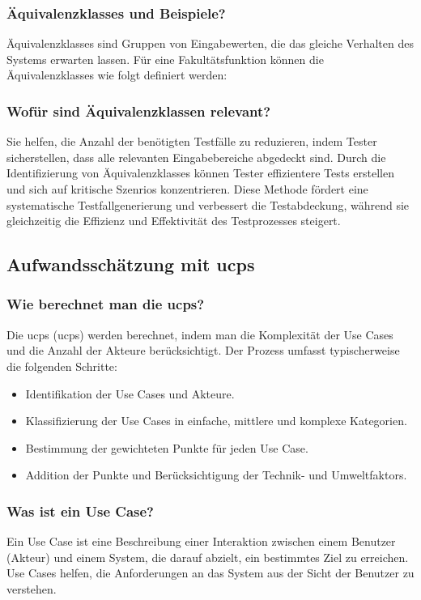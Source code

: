 \documentclass[main.tex]{subfiles}
\begin{document}
\subsubsection*{\glspl{Äquivalenzklasse} und Beispiele?} %
\glspl{Äquivalenzklasse} sind Gruppen von Eingabewerten, die das gleiche Verhalten des Systems erwarten lassen. Für eine Fakultätsfunktion können die \glspl{Äquivalenzklasse} wie folgt definiert werden:

\subsubsection*{Wofür sind Äquivalenzklassen relevant?}
Sie helfen, die Anzahl der benötigten Testfälle zu reduzieren, indem Tester sicherstellen, dass alle relevanten Eingabebereiche abgedeckt sind. Durch die Identifizierung von \glspl{Äquivalenzklasse} können Tester effizientere Tests erstellen und sich auf kritische \glspl{Szenrio} konzentrieren. Diese Methode fördert eine systematische Testfallgenerierung und verbessert die Testabdeckung, während sie gleichzeitig die Effizienz und Effektivität des Testprozesses steigert.

\subsection{Aufwandsschätzung mit \glspl{ucp}}
\subsubsection*{Wie berechnet man die \glspl{ucp}?}
Die \glspl{ucp} (\glspl{ucp}) werden berechnet, indem man die Komplexität der \glspl{Use Case} und die Anzahl der Akteure berücksichtigt. Der Prozess umfasst typischerweise die folgenden Schritte:
\begin{itemize}
    \item Identifikation der \glspl{Use Case} und Akteure.
    \item Klassifizierung der \glspl{Use Case} in einfache, mittlere und komplexe Kategorien.
    \item Bestimmung der gewichteten Punkte für jeden \gls{Use Case}.
    \item Addition der Punkte und Berücksichtigung der Technik- und \glspl{Umweltfaktor}.
\end{itemize}

\subsubsection*{Was ist ein \gls{Use Case}?}
Ein \gls{Use Case} ist eine Beschreibung einer Interaktion zwischen einem Benutzer (Akteur) und einem System, die darauf abzielt, ein bestimmtes Ziel zu erreichen. \glspl{Use Case} helfen, die Anforderungen an das System aus der Sicht der Benutzer zu verstehen.
\end{document}
